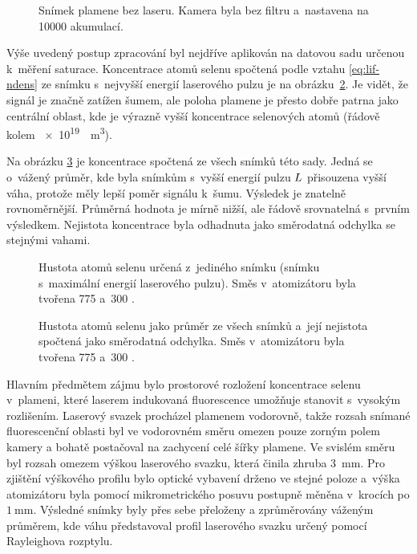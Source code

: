 \begin{figure}[htp]
	\centering
	
	\caption{Snímek plamene bez laseru.
		Kamera byla bez filtru a~nastavena na \num{10000} akumulací.}
	\label{fig:lif-flame}
\end{figure}

Výše uvedený postup zpracování byl nejdříve aplikován na datovou sadu
určenou k~měření saturace.
Koncentrace atomů selenu spočtená podle vztahu \eqref{eq:lif-ndens}
ze snímku s~nejvyšší energií laserového pulzu je
na obrázku~\ref{fig:lif-concentration-single}.
Je vidět, že signál je značně zatížen šumem, ale poloha plamene
je přesto dobře patrna jako centrální oblast,
kde je výrazně vyšší koncentrace selenových atomů
(řádově kolem \SI{e19}{\per\metre\cubed}).

Na obrázku \ref{fig:lif-concentration-mean} je koncentrace spočtená ze všech
snímků této sady.
Jedná se o~vážený průměr, kde byla snímkům s~vyšší energií pulzu $L$
přisouzena vyšší váha, protože měly lepší poměr signálu k~šumu.
Výsledek je znatelně rovnoměrnější.
Průměrná hodnota je mírně nižší, ale řádově srovnatelná s~prvním výsledkem.
Nejistota koncentrace byla odhadnuta jako směrodatná odchylka
se stejnými vahami.

\begin{figure}[htp]
	\centering
	
	\caption{Hustota atomů selenu určená z~jediného snímku
		(snímku s~maximální energií laserového pulzu).
		Směs v~atomizátoru byla tvořena \SI{775}{\sccm} 
		a~\SI{300}{\sccm} .}
	\label{fig:lif-concentration-single}
\end{figure}

\begin{figure}[htp]
	\centering
	
	
	\caption{Hustota atomů selenu jako průměr ze všech snímků
		a~její nejistota spočtená jako směrodatná odchylka.
		Směs v~atomizátoru byla tvořena \SI{775}{\sccm} 
		a~\SI{300}{\sccm} .}
	\label{fig:lif-concentration-mean}
\end{figure}

Hlavním předmětem zájmu bylo prostorové rozložení koncentrace selenu
v~plameni, které laserem indukovaná fluorescence umožňuje stanovit
s~vysokým rozlišením.
Laserový svazek procházel plamenem vodorovně, takže
rozsah snímané fluorescenční oblasti byl ve vodorovném směru omezen pouze
zorným polem kamery a bohatě postačoval na zachycení celé šířky plamene.
Ve svislém směru byl rozsah omezem výškou laserového svazku, která
činila zhruba \SI{3}{\milli\metre}.
Pro zjištění výškového profilu bylo optické vybavení drženo ve stejné
poloze a~výška atomizátoru byla pomocí mikrometrického posuvu postupně
měněna v~krocích po $\SI{1}{\milli\metre}$.
Výsledné snímky byly přes sebe přeloženy a zprůměrovány váženým průměrem,
kde váhu představoval profil laserového svazku určený pomocí Rayleighova
rozptylu.

